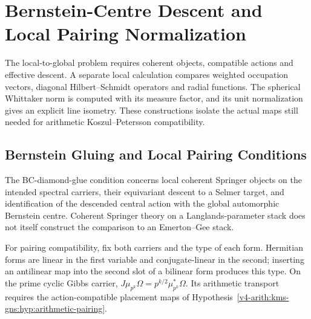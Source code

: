 \chapter{Bernstein-Centre Descent and Local Pairing Normalization}
\label{v4-arith:bc-glue-k5}
\label{v4-arith:bcglue-k5}

The local-to-global problem requires coherent objects, compatible
actions and effective descent. A separate local calculation compares
weighted occupation vectors, diagonal Hilbert--Schmidt operators and
radial functions. The spherical Whittaker norm is computed with its
measure factor, and its unit normalization gives an explicit line
isometry. These constructions isolate the actual maps still needed
for arithmetic Koszul--Petersson compatibility.

\section{Bernstein Gluing and Local Pairing Conditions}
\label{v4-arith:bcglue-k5:context}
The BC-diamond-glue condition concerns local coherent Springer
objects on the intended spectral carriers, their equivariant descent
to a Selmer target, and identification of the descended central
action with the global automorphic Bernstein centre. Coherent
Springer theory on a Langlands-parameter stack does not itself
construct the comparison to an Emerton--Gee stack.

For pairing compatibility, fix both carriers and the type of each
form. Hermitian forms are linear in the first variable and
conjugate-linear in the second; inserting an antilinear map into the
second slot of a bilinear form produces this type. On the prime
cyclic Gibbs carrier, \(J\mu_{p^k}\Omega=p^{k/2}\mu_{p^k}^*\Omega\).
Its arithmetic transport requires the action-compatible placement
maps of Hypothesis~\ref{v4-arith:kms-gns:hyp:arithmetic-pairing}.

